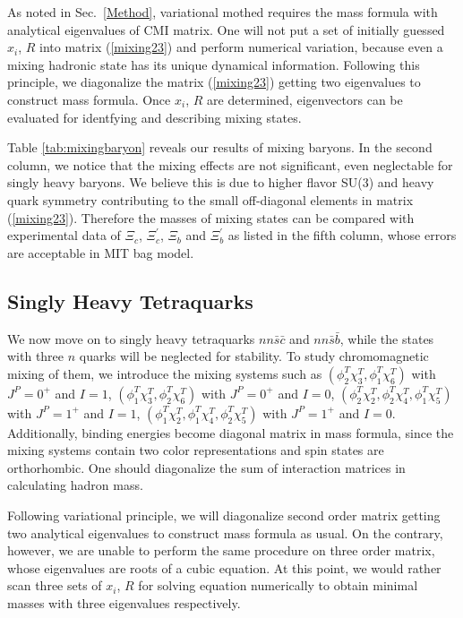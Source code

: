 \documentclass[prd,twocolumn,floatfix,nofootinbib]{revtex4}
\begin{document}
As noted in Sec.~\ref{Method}, variational mothed requires the mass formula with analytical eigenvalues of CMI matrix.
One will not put a set of initially guessed $x_{i}$, $R$ into matrix (\ref{mixing23}) and perform numerical variation, 
because even a mixing hadronic state has its unique dynamical information.
Following this principle, we diagonalize the matrix (\ref{mixing23}) getting two eigenvalues to construct mass formula.
Once $x_{i}$, $R$ are determined, eigenvectors can be evaluated for identfying and describing mixing states.

Table \ref{tab:mixingbaryon} reveals our results of mixing baryons.
In the second column, we notice that the mixing effects are not significant, even neglectable for singly heavy baryons.
We believe this is due to higher flavor SU(3) and heavy quark symmetry contributing to the small off-diagonal elements in matrix (\ref{mixing23}).
Therefore the masses of mixing states can be compared with experimental data of $\Xi_{c}$, $\Xi_{c}^{\prime}$, $\Xi_{b}$ and $\Xi_{b}^{\prime}$ as listed in the fifth column, whose errors are acceptable in MIT bag model.


\subsection{Singly Heavy Tetraquarks}
We now move on to singly heavy tetraquarks $nn\bar{s}\bar{c}$ and $nn\bar{s}\bar{b}$, while the states with three $n$ quarks will be neglected for stability.
To study chromomagnetic mixing of them, we introduce the mixing systems such as
$(\phi_{2}^{T}\chi_{3}^{T},\phi_{1}^{T}\chi_{6}^{T})$ with $J^{P}=0^{+}$ and $I=1$,
$(\phi_{1}^{T}\chi_{3}^{T},\phi_{2}^{T}\chi_{6}^{T})$ with $J^{P}=0^{+}$ and $I=0$,
$(\phi_{2}^{T}\chi_{2}^{T},\phi_{2}^{T}\chi_{4}^{T},\phi_{1}^{T}\chi_{5}^{T})$ with $J^{P}=1^{+}$ and $I=1$,
$(\phi_{1}^{T}\chi_{2}^{T},\phi_{1}^{T}\chi_{4}^{T},\phi_{2}^{T}\chi_{5}^{T})$ with $J^{P}=1^{+}$ and $I=0$.
Additionally, binding energies become diagonal matrix in mass formula, since the mixing systems contain two color representations and spin states are orthorhombic.
One should diagonalize the sum of interaction matrices in calculating hadron mass.

Following variational principle, we will diagonalize second order matrix getting two analytical eigenvalues to construct mass formula as usual.
On the contrary, however, we are unable to perform the same procedure on three order matrix, whose eigenvalues are roots of a cubic equation.
At this point, we would rather scan three sets of $x_{i}$, $R$ for solving equation numerically to obtain minimal masses with three eigenvalues respectively.
\end{document}
